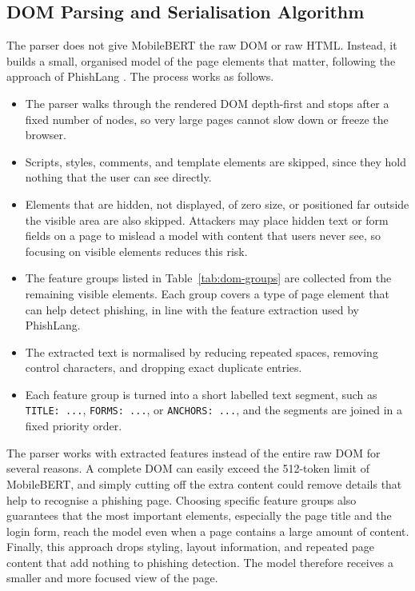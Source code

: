 \documentclass{FastFyp}
\begin{document}
\subsection{DOM Parsing and Serialisation Algorithm}
\label{sec:dom-parsing}
The parser does not give MobileBERT the raw DOM or raw HTML. Instead, it builds a small, organised model of the page elements that matter, following the approach of PhishLang \cite{phishlang2026}. The process works as follows.
\begin{itemize}
    \item The parser walks through the rendered DOM depth-first and stops after a fixed number of nodes, so very large pages cannot slow down or freeze the browser.
    \item Scripts, styles, comments, and template elements are skipped, since they hold nothing that the user can see directly.
    \item Elements that are hidden, not displayed, of zero size, or positioned far outside the visible area are also skipped. Attackers may place hidden text or form fields on a page to mislead a model with content that users never see, so focusing on visible elements reduces this risk.
    \item The feature groups listed in Table~\ref{tab:dom-groups} are collected from the remaining visible elements. Each group covers a type of page element that can help detect phishing, in line with the feature extraction used by PhishLang.
    \item The extracted text is normalised by reducing repeated spaces, removing control characters, and dropping exact duplicate entries.
    \item Each feature group is turned into a short labelled text segment, such as \texttt{TITLE: ...}, \texttt{FORMS: ...}, or \texttt{ANCHORS: ...}, and the segments are joined in a fixed priority order.
\end{itemize}
The parser works with extracted features instead of the entire raw DOM for several reasons. A complete DOM can easily exceed the 512-token limit of MobileBERT, and simply cutting off the extra content could remove details that help to recognise a phishing page. Choosing specific feature groups also guarantees that the most important elements, especially the page title and the login form, reach the model even when a page contains a large amount of content. Finally, this approach drops styling, layout information, and repeated page content that add nothing to phishing detection. The model therefore receives a smaller and more focused view of the page.
\end{document}
